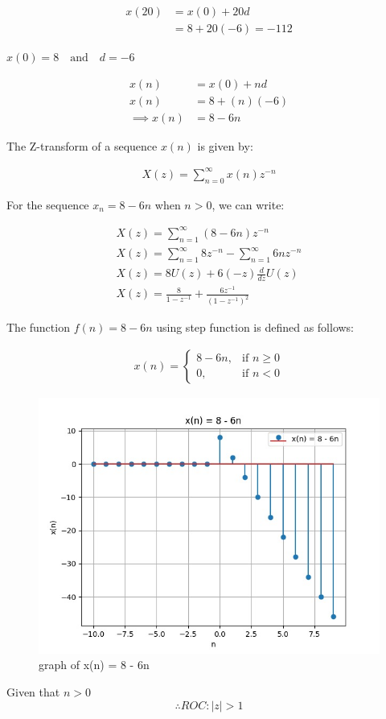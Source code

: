 \documentclass[journal,12pt,twocolumn]{IEEEtran}
\theoremstyle{remark}
\begin{document}
    \begin{align}
        x(20)&=x(0)+20d\\
        &=8+20(-6) = -112
    \end{align}
    
\centering

$x(0) = 8\quad \text{and}\quad d = -6$

    \begin{align}
        x(n)&=x(0)+nd\\
        x(n)&=8+(n)(-6)\\
        \implies x(n)&=8-6n
    \end{align}    
    
The Z-transform of a sequence $x(n)$ is given by:

    \begin{align}
        X(z) = \sum_{n=0}^{\infty} x(n) z^{-n} 
    \end{align}
    
For the sequence $x_n = 8 - 6n$ when $n > 0$, we can write:

    \begin{align}
        X(z) = \sum_{n=1}^{\infty} (8 - 6n)z^{-n}\\
        X(z) = \sum_{n=1}^{\infty} 8z^{-n} - \sum_{n=1}^{\infty} 6nz^{-n}\\
        X(z) = 8U(z) + 6(-z)\frac{d}{dz} U(z)\\
        X(z)=\frac{8}{1-z^{-1}}+\frac{6z^{-1}}{(1-z^{-1})^{2}}
    \end{align}

The function $f(n) = 8 - 6n$ using step function is defined as follows:

    \begin{align}
        x(n) = 
        \begin{cases}
            8 - 6n, & \text{if } n \geq 0 \\
            0, & \text{if } n < 0
        \end{cases}
    \end{align}
    
    \begin{figure}[h]
        \centering
        \includegraphics[width=1\linewidth]{figs/Figure_1.png}
        \caption{graph of x(n) = 8 - 6n}
        \label{8 - 6n dicrete function}
    \end{figure}
    
\newpage
Given that \( n > 0 \)
\[\therefore ROC : |z| > 1\]
    
\end{document}
